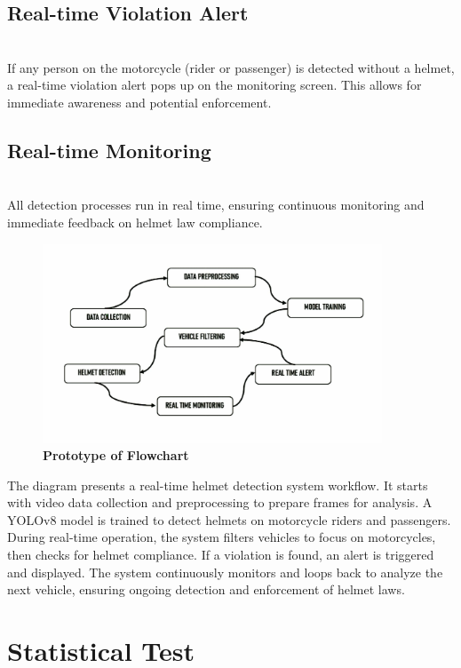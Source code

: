 \begin{refsection}
    \subsection {Real-time Violation Alert} \\
    If any person on the motorcycle (rider or passenger) is detected without a helmet, a real-time violation alert pops up on the monitoring screen. This allows for immediate awareness and potential enforcement.

    \subsection {Real-time Monitoring} \\
    All detection processes run in real time, ensuring continuous monitoring and immediate feedback on helmet law compliance.

\begin{figure}[H]
    \centering
    \includegraphics[width=0.9\textwidth]{figures/Fig 5.jpg}
    \caption{\textbf{Prototype of Flowchart}}
    \label{figures/Fig 5.jpg}
\end{figure}

The diagram presents a real-time helmet detection system workflow. It starts with video data collection and preprocessing to prepare frames for analysis. A YOLOv8 model is trained to detect helmets on motorcycle riders and passengers. During real-time operation, the system filters vehicles to focus on motorcycles, then checks for helmet compliance. If a violation is found, an alert is triggered and displayed. The system continuously monitors and loops back to analyze the next vehicle, ensuring ongoing detection and enforcement of helmet laws.

\section*{Statistical Test}


\end{refsection}

